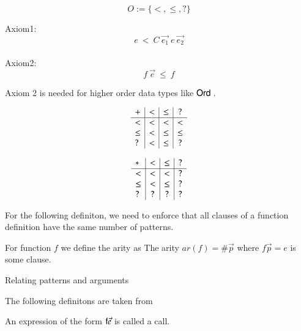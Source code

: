 \begin{definition}[Order]
\[ O := \{ < , \leq , ? \} \]
\end{definition}
Axiom1:
\[ e \: < \: C \: \vec{e_1} \: e \: \vec{e_2} \]
\\
Axiom2:
\[ f \: \vec{e} \: \leq \: f \] 

Axiom 2 is needed for higher order data types like $\mathsf{Ord}\:$.

\begin{definition}
\[
\begin{array}{l | c |c | c }

 +    &  <   &  \leq   &  ? \\
 \hline 
 <    &  <   & <       &  <   \\
 \leq &  <   & \leq    &  \leq \\
 ?    &  <   & \leq    &  ?
\end{array}
\]

\end{definition}


\begin{definition}
\[
\begin{array}{l | c |c | c}
 *   &  <  &  \leq & ? \\
\hline
  <   & <    & <    &   ? \\
 \leq & <    & \leq &   ?  \\
 ?    & ?    & ?    &   ?
\end{array}
\]
\end{definition}

For the following definiton, we need to enforce that all clauses of a function definition have the same number of patterns.
\begin{definition}
For function $f$ we define the arity as The arity $ar(f) = \# \vec{p} $ where $f \vec{p} = e $ is some clause.   
\end{definition}

\begin{definition}{Relating patterns and arguments}
\end{definition}

The following definitons are taken from \cite{abelAltenkirch:predStRec}

\begin{definition}
An expression of the form $\mathsf{f} \vec{e}$ is called a call.
\end{definition}

\newcommand{\mino}{\mathrm{min}\:}
\newcommand{\maxo}{\mathrm{max}\:}
\newcommand{\supo}{\mathrm{sup}\:}
\newcommand{\info}{\mathrm{inf}\:}

